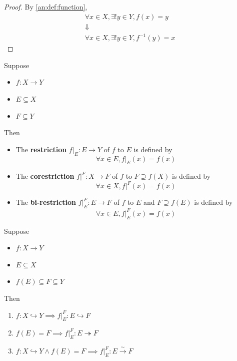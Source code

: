 \begin{proof}
  By \cref{an:def:function},
  \[
    \begin{array}{c}
      \forall x \in X, \exists! y \in Y, f(x) = y \\
      \Downarrow                                  \\
      \forall x \in X, \exists! y \in Y, f^{-1}(y) = x
    \end{array}
  \]
\end{proof}

\bigskip

\begin{definition} \label{an:def:restriction-function}
  Suppose
  \begin{itemize}
    \item $f: X \to Y$
    \item $E \subseteq X$
    \item $F \subseteq Y$
  \end{itemize}
  Then
  \begin{itemize}
    \item The \textbf{restriction} $f|_{E}: E \to Y$ of $f$ to $E$ is defined by
          \[
            \forall x \in E, f|_{E}(x) = f(x)
          \]
    \item The \textbf{corestriction} $f|^{F}: X \to F$ of $f$ to $F \supseteq f(X)$ is defined by
          \[
            \forall x \in X, f|^{F}(x) = f(x)
          \]
    \item The \textbf{bi-restriction} $f|_{E}^{F}: E \to F$ of $f$ to $E$ and $F \supseteq f(E)$ is defined by
          \[
            \forall x \in E, f|_{E}^{F}(x) = f(x)
          \]
  \end{itemize}
\end{definition}

\bigskip

\begin{theorem} \label{an:thm:properties-of-restriction-functions}
  Suppose
  \begin{itemize}
    \item $f: X \to Y$
    \item $E \subseteq X$
    \item $f(E) \subseteq F \subseteq Y$
  \end{itemize}
  Then
  \begin{enumerate}[label=\textbf{(\Alph*)}]
    \item $f: X \hookrightarrow Y \implies f|_{E}^{F}: E \hookrightarrow F$
    \item $f(E) = F \implies f|_{E}^{F}: E \twoheadrightarrow F$
    \item $f: X \hookrightarrow Y \land f(E) = F \implies f|_{E}^{F}: E \xrightarrow{\sim} F$
  \end{enumerate}
\end{theorem}

